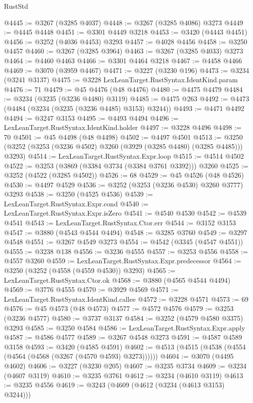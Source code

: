 \begin{lexlean}{RustStd}
\begin{coremodule}
@4445 := @3267 (@3285 @4037)
@4448 := @3267 (@3285 @4086) @3273
@4449 := @4445 @4448
@4451 := @3301 @4449 @3218
@4453 := @3420 (@4443 @4451)
@4456 := @3252 (@4036 @4453) @3293
@4457 := @4028 @4456
@4458 := @3250 @4457
@4460 := @3267 (@3285 @3964)
@4463 := @3267 (@3285 @4033) @3273
@4464 := @4460 @4463
@4466 := @3301 @4464 @3218
@4467 := @4458 @4466
@4469 := @3070 (@3959 @4467)
@4471 := @3227 (@3230 @196)
@4473 := @3234 (@3241 @3137)
@4475 := @3228 LexLeanTarget.RustSyntax.IdentKind.param
@4476 := 71
@4479 := @45 @4476 (@48 @4476)
@4480 := @4475 @4479
@4484 := @3234 (@3235 (@3236 @4480) @3119)
@4485 := @4475 @263
@4492 := @4473 (@4484 (@3234 (@3235 (@3236 @4485) @3153) @3244))
@4493 := @4471 @4492
@4494 := @3247 @3153
@4495 := @4493 @4494
@4496 := LexLeanTarget.RustSyntax.IdentKind.holder
@4497 := @3228 @4496
@4498 := 70
@4501 := @45 @4498 (@48 @4498)
@4502 := @4497 @4501
@4513 := @3250 (@3252 (@3253 (@3236 @4502) @3260 (@3929 (@3285 @4480) (@3285 @4485))) @3293)
@4514 := LexLeanTarget.RustSyntax.Expr.loop
@4515 := @4514 @4502
@4522 := @3253 (@3869 (@3384 @3734 (@3384 @3761 @3392))) @3260
@4525 := @3252 (@4522 (@3285 @4502))
@4526 := 68
@4529 := @45 @4526 (@48 @4526)
@4530 := @4497 @4529
@4536 := @3252 (@3253 (@3236 @4530) @3260 @3777) @3293
@4538 := @3250 (@4525 @4536)
@4539 := LexLeanTarget.RustSyntax.Expr.cond
@4540 := LexLeanTarget.RustSyntax.Expr.isZero
@4541 := @4540 @4530
@4542 := @4539 @4541
@4543 := LexLeanTarget.RustSyntax.Ctor.err
@4544 := @3152 @3153
@4547 := @3880 (@4543 @4544 @4494)
@4548 := @3285 @3760
@4549 := @3297 @4548
@4551 := @3267 @4549 @3273
@4554 := @4542 (@3345 (@4547 @4551))
@4555 := @3238 @138
@4556 := @3236 @4555
@4557 := @3253 @4556
@4558 := @4557 @3260
@4559 := LexLeanTarget.RustSyntax.Expr.predecessor
@4564 := @3250 (@3252 (@4558 (@4559 @4530)) @3293)
@4565 := LexLeanTarget.RustSyntax.Ctor.ok
@4568 := @3880 (@4565 @4544 @4494)
@4569 := @3776 @4555
@4570 := @3929 @4569
@4571 := LexLeanTarget.RustSyntax.IdentKind.callee
@4572 := @3228 @4571
@4573 := 69
@4576 := @45 @4573 (@48 @4573)
@4577 := @4572 @4576
@4579 := @3253 (@3236 @4577)
@4580 := @3737 @3137
@4584 := @3252 (@4579 @4580 @3375) @3293
@4585 := @3250 @4584
@4586 := LexLeanTarget.RustSyntax.Expr.apply
@4587 := @4586 @4577
@4589 := @3267 @4548 @3273
@4591 := @4587 @4589 @3158
@4593 := @3420 (@4585 @4591)
@4602 := @4513 (@4515 (@4538 (@4554 (@4564 (@4568 (@3267 (@4570 @4593) @3273))))))
@4604 := @3070 (@4495 @4602)
@4606 := @3227 (@3230 @205)
@4607 := @3235 @3734
@4609 := @3234 (@4607 @3119)
@4610 := @3235 @3761
@4612 := @3234 (@4610 @3119)
@4613 := @3235 @4556
@4619 := @3243 (@4609 (@4612 (@3234 (@4613 @3153) @3244)))

\end{coremodule}
\end{lexlean}
